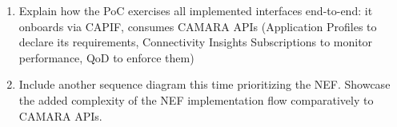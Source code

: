 {\begin{enumerate}
        \begin{enumerate}
            \item (in progress)
            \item Onboarding via CAPIF
            \item the creation of application profile according declaring application requirements (does not need to match exactly the slice requirements)
            \item the creation of connectivity insights subscription to be notified when the application requirements are not being respected
            \item  the change of \acs{QoS} profile in response to being unable to meet the application requirements or in response to a location change (CAMARA QoD API)
        \end{enumerate}
        \item Explain how the \acs{PoC} exercises all implemented interfaces end-to-end: it onboards via CAPIF, consumes CAMARA APIs (Application Profiles to declare its requirements, Connectivity Insights Subscriptions to monitor performance, QoD to enforce them)
        \item Include another sequence diagram this time prioritizing the NEF. Showcase the added complexity of the NEF implementation flow comparatively to CAMARA APIs.
    \end{enumerate}
}
